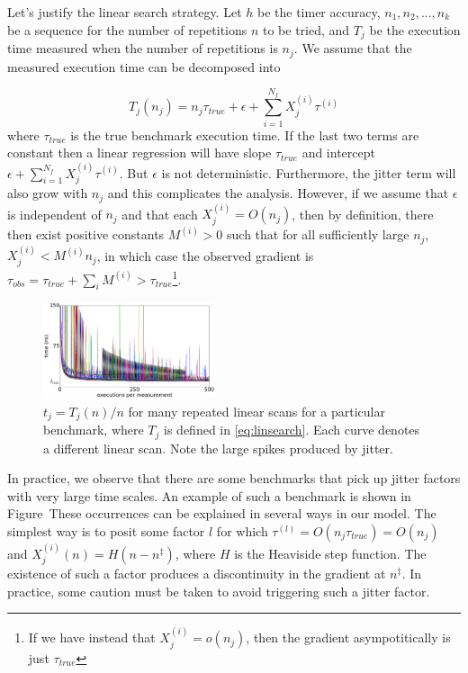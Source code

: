 \documentclass[conference]{IEEEtran}
\begin{document}
Let's justify the linear search strategy. Let $h$ be the timer accuracy, $n_1, n_2, ..., n_k$ be a sequence for the number of repetitions $n$ to be tried, and $T_j$ be the execution time measured when the number of repetitions is $n_j$. We assume that the measured execution time can be decomposed into

\begin{equation}
    \label{eq:linsearch}
    T_j(n_j) = n_j \tau_{true} + \epsilon + \sum_{i=1}^{N_f} X_j^{(i)} \tau^{(i)}
\end{equation}
%
where $\tau_{true}$ is the true benchmark execution time. If the last two terms
are constant then a linear regression will have slope $\tau_{true}$ and intercept $\epsilon + \sum_{i=1}^{N_f} X_j^{(i)} \tau^{(i)}$. But $\epsilon$ is not deterministic. Furthermore, the jitter term will also grow with $n_j$ and this complicates the analysis.
However, if we assume that $\epsilon$ is independent of $n_j$ and that each $X_j^{(i)} = O(n_j)$, then by definition, there then exist positive constants $M^{(i)} > 0$ such that for all sufficiently large $n_j$, $X_j^{(i)} < M^{(i)} n_j$, in which case the observed gradient is $\tau_{obs} = \tau_{true} + \sum_i M^{(i)} > \tau_{true}$\footnote{If we have instead that $X_j^{(i)} = o(n_j)$, then the gradient asympotitically is just $\tau_{true}$}.

\begin{figure}
\centering
\includegraphics[width=0.45\textwidth]{figures/fig2/linear_scan_branchsum}
\caption{$t_j = T_j(n)/n$ for many repeated linear scans for a particular benchmark, where $T_j$ is defined in \eqref{eq:linsearch}. Each curve denotes a different linear scan. Note the large spikes produced by jitter.}
\label{fig:scaling}
\end{figure}

In practice, we observe that there are some benchmarks that pick up jitter factors with very large time scales. An example of such a benchmark is shown in Figure~These occurrences can be explained in several ways in our model. The simplest way is to posit some factor $l$ for which $\tau^{(l)} = O(n_j \tau_{true}) = O(n_j)$ and $X_j^{(i)}(n) = H(n - n^\ddagger)$,
where $H$ is the Heaviside step function. The existence of such a factor produces a discontinuity in the gradient at $n^\ddagger$. In practice, some caution must be taken to avoid triggering such a jitter factor.
\end{document}
